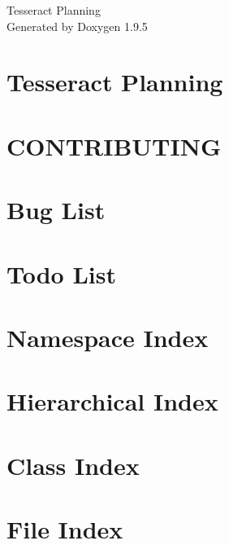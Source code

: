 \documentclass[twoside]{book}
\newcommand{\+}{\discretionary{\mbox{\scriptsize$\hookleftarrow$}}{}{}}
\newcommand{\clearemptydoublepage}{%
    \newpage{\pagestyle{empty}\cleardoublepage}%
  }
\begin{document}
  \raggedbottom
    \hypersetup{pageanchor=false,
                bookmarksnumbered=true,
                pdfencoding=unicode
               }
  \begin{titlepage}
  \vspace*{7cm}
  \begin{center}%
  {\Large Tesseract Planning}\\
  \vspace*{1cm}
  {\large Generated by Doxygen 1.9.5}\\
  \end{center}
  \end{titlepage}
  \clearemptydoublepage
  \tableofcontents
  \clearemptydoublepage
  \hypersetup{pageanchor=true}
\chapter{Tesseract Planning}
\label{index}\hypertarget{index}{}
\chapter{CONTRIBUTING}
\label{md_CONTRIBUTING}

\chapter{Bug List}
\label{bug}

\chapter{Todo List}
\label{todo}

\chapter{Namespace Index}

\chapter{Hierarchical Index}

\chapter{Class Index}

\chapter{File Index}

\end{document}
